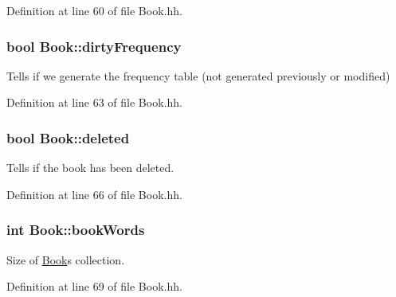 Definition at line 60 of file Book.\+hh.

\subsubsection[{\texorpdfstring{dirty\+Frequency}{dirtyFrequency}}]{\setlength{\rightskip}{0pt plus 5cm}bool Book\+::dirty\+Frequency\hspace{0.3cm}{\ttfamily [private]}}\hypertarget{class_book_ad1df1050750f0605efdfab51b86c0765}{}\label{class_book_ad1df1050750f0605efdfab51b86c0765}


Tells if we generate the frequency table (not generated previously or modified) 



Definition at line 63 of file Book.\+hh.

\subsubsection[{\texorpdfstring{deleted}{deleted}}]{\setlength{\rightskip}{0pt plus 5cm}bool Book\+::deleted\hspace{0.3cm}{\ttfamily [private]}}\hypertarget{class_book_a1fba52d984d1651760cd79dc393415ab}{}\label{class_book_a1fba52d984d1651760cd79dc393415ab}


Tells if the book has been deleted. 



Definition at line 66 of file Book.\+hh.

\subsubsection[{\texorpdfstring{book\+Words}{bookWords}}]{\setlength{\rightskip}{0pt plus 5cm}int Book\+::book\+Words\hspace{0.3cm}{\ttfamily [private]}}\hypertarget{class_book_a36f1e0b30a0ad17606976556cab45a23}{}\label{class_book_a36f1e0b30a0ad17606976556cab45a23}


Size of \hyperlink{class_book}{Book}\textquotesingle{}s collection. 



Definition at line 69 of file Book.\+hh.

